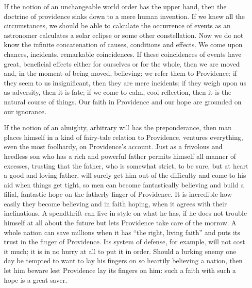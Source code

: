 \documentclass[12pt,a4paper,openany]{book}
\newcommand{\opage}[1]{\marginnote{\footnotesize\textit{[#1]}}}
\begin{document}
If the notion of an unchangeable world order has the upper hand, then the doctrine of providence sinks down to a mere
human invention. If we knew all the circumstances, we should be able to calculate the occurrence of events as an
astronomer calculates a solar eclipse or some other constellation. Now we do not know the infinite concatenation of
causes, conditions and effects. We come upon chances, incidents, remarkable coincidences. If these coincidences of
events have great, beneficial effects either for ourselves or for the whole, then we are moved and, in the moment of
being moved, believing: we refer them to Providence; if they seem to us insignificant, then they are mere incidents;
if they weigh upon us as adversity, then it is fate; if we come to calm, cool reflection, then it is the natural
course of things. Our faith in Providence and our hope are grounded on our ignorance.

If the notion of an almighty, arbitrary will has the preponderance, then man places himself in a kind of fairy-tale
relation to Providence, ventures everything, even the most foolhardy, on Providence's account. Just as a frivolous and
heedless son who has a rich and powerful father permits himself all manner of excesses, trusting that the father, who
is somewhat strict, to be sure, but at heart a good and loving father, will surely get him out of the difficulty and
come to his aid when things get tight, so men can become fantastically believing and build a filial, fantastic hope
on the fatherly finger of Providence. It is incredible how easily they become believing and
\setcounter{footnote}{0}%
\opage{56}in faith hoping, when it agrees with their inclinations. A spendthrift can live in style on what he has, if
he does not trouble himself at all about the future but lets Providence take care of the morrow. A whole nation can
save millions when it has ``the right, living faith'' and puts its trust in the finger of Providence. Its system of
defense, for example, will not cost it much; it is in no hurry at all to put it in order. Should a lurking enemy one
day be tempted to want to lay his fingers on so heartily believing a nation, then let him beware lest Providence lay
its fingers on him: such a faith with such a hope is a great saver.
\end{document}
